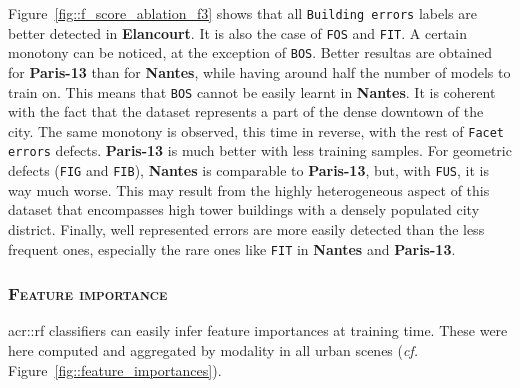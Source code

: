             Figure~\ref{fig::f_score_ablation_f3} shows that all \texttt{Building errors} labels are better detected in \textbf{Elancourt}.
            It is also the case of \texttt{FOS} and \texttt{FIT}.
            A certain monotony can be noticed, at the exception of \texttt{BOS}.
            Better resultas are obtained for \textbf{Paris-13} than for \textbf{Nantes}, while having around half the number of models to train on.
            This means that \texttt{BOS} cannot be easily learnt in \textbf{Nantes}.
            It is coherent with the fact that the dataset represents a part of the dense downtown of the city.
            The same monotony is observed, this time in reverse, with the rest of \texttt{Facet errors} defects. \textbf{Paris-13} is much better with less training samples.
            For geometric defects (\texttt{FIG} and \texttt{FIB}), \textbf{Nantes} is comparable to \textbf{Paris-13}, but, with \texttt{FUS}, it is way much worse.
            This may result from the highly heterogeneous aspect of this dataset that encompasses high tower buildings with a densely populated city district.
            Finally, well represented errors are more easily detected than the less frequent ones, especially the rare ones like \texttt{FIT} in \textbf{Nantes} and \textbf{Paris-13}.
        
        \subsubsection{\textsc{Feature importance}}
            \label{subsubsec::experiments::evaluation::baseline_feature_analysis::feature_importance}
            \gls{acr::rf} classifiers can easily infer feature importances at training time.
            These were here computed and aggregated by modality in all urban scenes (\textit{cf.} Figure~\ref{fig::feature_importances}).\\

